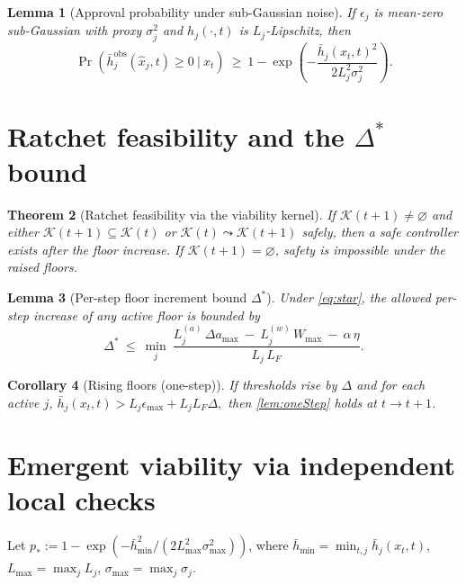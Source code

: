 \documentclass[11pt]{article}
\newtheorem{theorem}{Theorem}[section]
\newtheorem{lemma}[theorem]{Lemma}
\newtheorem{corollary}[theorem]{Corollary}
\theoremstyle{definition}
\newcommand{\K}{\mathcal{K}}
\newcommand{\1}{\mathbf{1}}
\begin{document}
\begin{lemma}[Approval probability under sub-Gaussian noise]
\label{lem:concentration}
If $\epsilon_j$ is mean-zero sub-Gaussian with proxy $\sigma_j^2$ and $h_j(\cdot,t)$ is $L_j$-Lipschitz, then
\[
\Pr\!\left(\bar h^{\mathrm{obs}}_j(\hat x_j,t)\ge 0\ \big|\ x_t\right)\ \ge\ 1-\exp\!\left(-\frac{\bar h_j(x_t,t)^2}{2L_j^2\sigma_j^2}\right).
\]
\end{lemma}

\section{Ratchet feasibility and the $\Delta^\ast$ bound}
\begin{theorem}[Ratchet feasibility via the viability kernel]
\label{thm:kernelRatchet}
If $\K(t+1)\neq\varnothing$ and either $\K(t+1)\subseteq\K(t)$ or $\K(t)\leadsto \K(t+1)$ safely, then a safe controller exists after the floor increase. If $\K(t+1)=\varnothing$, safety is impossible under the raised floors.
\end{theorem}

\begin{lemma}[Per-step floor increment bound $\Delta^\ast$]
\label{lem:delta}
Under \cref{eq:star}, the allowed per-step increase of any active floor is bounded by
\[
\Delta^\ast\ \le\ \min_{j}\ \frac{L^{(a)}_j\,\Delta a_{\max}\ -\ L^{(w)}_j\,W_{\max}\ -\ \alpha\,\eta}{L_j\,L_F}.
\]
\end{lemma}

\begin{corollary}[Rising floors (one-step)]
\label{cor:rising}
If thresholds rise by $\Delta$ and for each active $j$,
\(
\bar h_j(x_t,t) > L_j\epsilon_{\max} + L_j L_F \Delta,
\)
then \cref{lem:oneStep} holds at $t\to t+1$.
\end{corollary}

\section{Emergent viability via independent local checks}

Let $p_\ast:=1-\exp(-\bar h_{\min}^2/(2L_{\max}^2\sigma_{\max}^2))$, where $\bar h_{\min}=\min_{t,j}\bar h_j(x_t,t)$, $L_{\max}=\max_j L_j$, $\sigma_{\max}=\max_j \sigma_j$.
\end{document}
